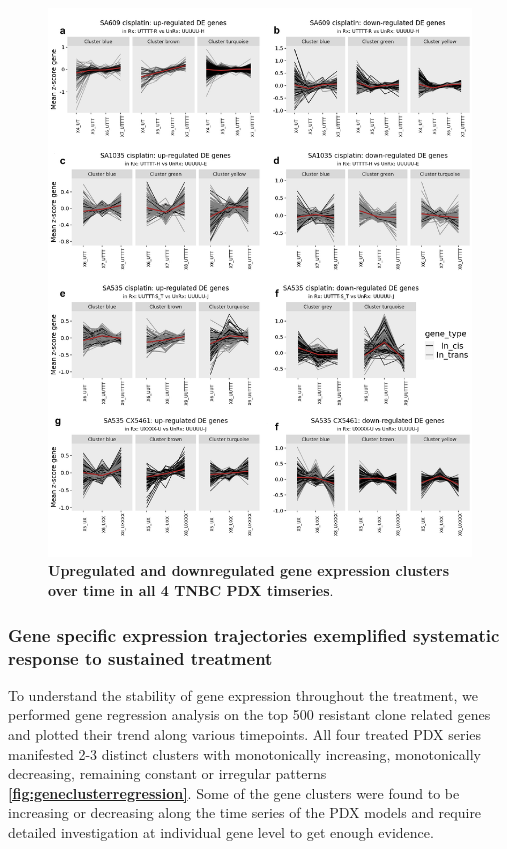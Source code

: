 \begin{figure}
\centering
 \includegraphics[width=\textwidth]{Figures/chap5/genesclustering_regression.pdf}
\caption[Gene expression changes over time]
	{\small
	 \textbf{Upregulated and downregulated gene expression clusters over time in all 4 TNBC PDX timseries}.
 }

	\label{fig:geneclusterregression}
\end{figure}


\subsubsection{Gene specific expression trajectories exemplified systematic response to sustained treatment}
To understand the stability of gene expression throughout the treatment, we performed gene regression analysis on the top 500 resistant clone related genes and plotted their trend along various timepoints. All four treated PDX series manifested 2-3 distinct clusters with monotonically increasing, monotonically decreasing, remaining constant or irregular patterns \textbf{\autoref{fig:geneclusterregression}}. Some of the gene clusters were found to be increasing or decreasing along the time series of the PDX models and require detailed investigation at individual gene level to get enough evidence.
 
